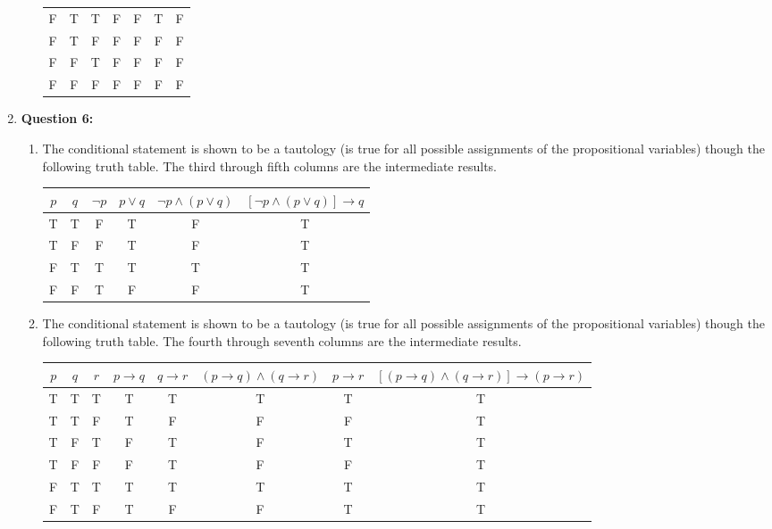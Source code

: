\documentclass[11pt]{article}
\begin{document}
\begin{enumerate}
\begin{enumerate}[label=(\alph*)]
\begin{center}
\begin{tabular}{|c|c|c|c|c|c|c|}
F & T & T & F & F & T & F\\
F & T & F & F & F & F & F\\
F & F & T & F & F & F & F\\
F & F & F & F & F & F & F\\
\hline
\end{tabular}
\end{center}
\end{enumerate}
\item
\textbf{Question 6:}
\begin{enumerate}[label=(\alph*)]
\item
The conditional statement is shown to be a tautology (is true for all possible
assignments of the propositional variables) though the following truth table. The
third through fifth columns are the intermediate results.
\begin{center}
\begin{tabular}{|c|c|c|c|c|c|}
\hline
$p$ & $q$ & $\lnot p$ & $p \lor q$ & $\lnot p \land (p \lor q)$ & $[\lnot p \land
(p \lor q)] \rightarrow q$\\
\hline
T & T & F & T & F & T \\
T & F & F & T & F & T \\
F & T & T & T & T & T \\
F & F & T & F & F & T \\
\hline
\end{tabular}
\end{center}
\item
The conditional statement is shown to be a tautology (is true for all possible
assignments of the propositional variables) though the following truth table. The
fourth through seventh columns are the intermediate results.
\begin{center}
\begin{tabular}{|c|c|c|c|c|c|c|c|}
\hline
$p$ & $q$ & $r$ & $p \rightarrow q$ & $q \rightarrow r$ & $(p \rightarrow q) \land
(q \rightarrow r)$ & $p \rightarrow r$ & $[(p \rightarrow q) \land (q \rightarrow
r)] \rightarrow (p \rightarrow r)$\\
\hline
T & T & T & T & T & T & T & T \\
T & T & F & T & F & F & F & T \\
T & F & T & F & T & F & T & T \\
T & F & F & F & T & F & F & T \\
F & T & T & T & T & T & T & T \\
F & T & F & T & F & F & T & T \\

\end{tabular}
\end{center}
\end{enumerate}
\end{enumerate}
\end{document}
